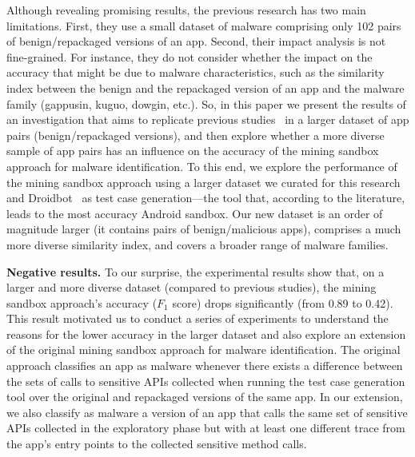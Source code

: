 Although revealing promising results, the previous research has two main limitations. First, they use a small dataset of malware comprising only 102 pairs of benign/repackaged versions of an app. Second, their impact analysis is not fine-grained. For instance, they do not consider whether the impact on the accuracy that might be due to malware characteristics, such as the similarity index between the benign and the repackaged version of an app and the malware family (gappusin, kuguo, dowgin, etc.). So, in this paper we present the results of an investigation that aims to replicate previous studies~\cite{DBLP:conf/wcre/BaoLL18,DBLP:conf/scam/CostaMCMVBC20} in a larger dataset of app pairs (benign/repackaged versions), and then explore whether a more diverse sample of app pairs has an influence on the accuracy of the mining sandbox approach for malware identification. To this end, we explore the performance of the mining sandbox approach using a larger dataset we curated for this research and Droidbot~\cite{DBLP:conf/icse/LiYGC17} as test case generation---the tool that, according to the literature, leads to the most accuracy Android sandbox. Our new dataset is an order of magnitude larger (it contains \apps pairs of benign/malicious apps), comprises a much more diverse similarity index, and covers a broader range of malware families. 



{\bf Negative results.} To our surprise, the experimental results show that, on a larger and more diverse dataset (compared to previous studies), the mining sandbox approach's accuracy ($F_1$ score) drops significantly (from 0.89 to 0.42). This result motivated us to conduct a series of experiments to understand the reasons for the lower accuracy in the larger dataset and also explore an extension of the original mining sandbox approach for malware identification. The original approach classifies an app as malware whenever there exists a difference between the sets of calls to sensitive APIs collected when running the test case generation tool over the original and repackaged versions of the same app. In our extension, we also classify as malware a version of an app that calls the same set of sensitive APIs collected in the exploratory phase but with at least one different trace from the app's entry points to the collected sensitive method calls.


